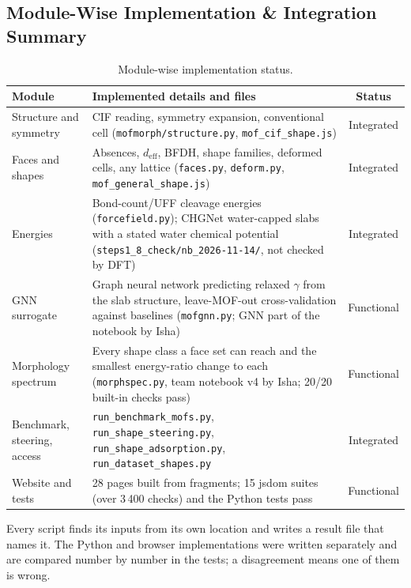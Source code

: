 \documentclass[11pt, a4paper]{article}
\begin{document}
\subsection{Module-Wise Implementation \& Integration Summary}
\begin{table}[H]
    \centering
    \footnotesize
    \renewcommand{\arraystretch}{1.2}
    \begin{tabular}{|p{3.3cm}|p{9.0cm}|c|}
        \hline
        \textbf{Module} & \textbf{Implemented details and files} & \textbf{Status} \\
        \hline
        Structure and symmetry & CIF reading, symmetry expansion, conventional cell (\texttt{mofmorph/structure.py}, \texttt{mof\_cif\_shape.js}) & Integrated \\
        \hline
        Faces and shapes & Absences, $d_\text{eff}$, BFDH, shape families, deformed cells, any lattice (\texttt{faces.py}, \texttt{deform.py}, \texttt{mof\_general\_shape.js}) & Integrated \\
        \hline
        Energies & Bond-count/UFF cleavage energies (\texttt{forcefield.py}); CHGNet water-capped slabs with a stated water chemical potential (\texttt{steps1\_8\_check/nb\_2026-11-14/}, not checked by DFT) & Integrated \\
        \hline
        GNN surrogate & Graph neural network predicting relaxed $\gamma$ from the slab structure, leave-MOF-out cross-validation against baselines (\texttt{mofgnn.py}; GNN part of the notebook by Isha) & Functional \\
        \hline
        Morphology spectrum & Every shape class a face set can reach and the smallest energy-ratio change to each (\texttt{morphspec.py}, team notebook v4 by Isha; 20/20 built-in checks pass) & Functional \\
        \hline
        Benchmark, steering, access & \texttt{run\_benchmark\_mofs.py}, \texttt{run\_shape\_steering.py}, \texttt{run\_shape\_adsorption.py}, \texttt{run\_dataset\_shapes.py} & Integrated \\
        \hline
        Website and tests & 28 pages built from fragments; 15 jsdom suites (over 3\,400 checks) and the Python tests pass & Functional \\
        \hline
    \end{tabular}
    \caption{Module-wise implementation status.}
\end{table}
\noindent
Every script finds its inputs from its own location and writes a result file that names it. The Python and browser implementations were written separately and are compared number by number in the tests; a disagreement means one of them is wrong.
\end{document}
